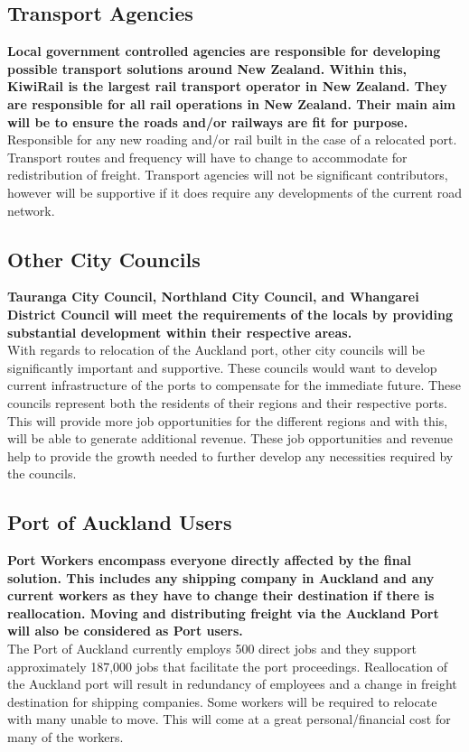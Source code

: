\begin{multicols}{2}
\subsection*{Transport Agencies}
    \textbf{Local government controlled agencies are responsible for developing possible transport solutions around New Zealand. Within this, KiwiRail is the largest rail transport operator in New Zealand. They are responsible for all rail operations in New Zealand. Their main aim will be to ensure the roads and/or railways are fit for purpose.}  
    \\ Responsible for any new roading and/or rail built in the case of a relocated port. Transport routes and frequency will have to change to accommodate for redistribution of freight. Transport agencies will not be significant contributors, however will be supportive if it does require any developments of the current road network.
\subsection*{Other City Councils}
    \textbf{Tauranga City Council, Northland City Council, and Whangarei District Council will meet the requirements of the locals by providing substantial development within their respective areas. }
    \\With regards to relocation of the Auckland port, other city councils will be significantly important and supportive. These councils would want to develop current infrastructure of the ports to compensate for the immediate future. These councils represent both the residents of their regions and their respective ports. This will provide more job opportunities for the different regions and with this, will be able to generate additional revenue. These job opportunities and revenue help to provide the growth needed to further develop any necessities required by the councils.
\subsection*{Port of Auckland Users}
    \textbf{Port Workers encompass everyone directly affected by the final solution. This includes any shipping company in Auckland and any current workers as they have to change their destination if there is reallocation. Moving and distributing freight via the Auckland Port will also be considered as Port users.}
    \\The Port of Auckland currently employs 500 direct jobs and they support approximately 187,000 jobs that facilitate the port proceedings. Reallocation of the Auckland port will result in redundancy of employees and a change in freight destination for shipping companies.  Some workers will be required to relocate with many unable to move. This will come at a great personal/financial cost for many of the workers.

\end{multicols}
